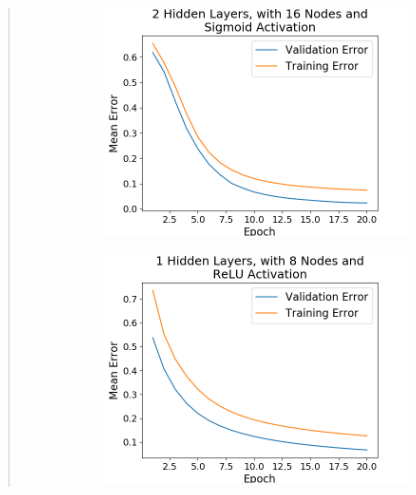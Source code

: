 \documentclass{article}
\begin{document}
\begin{quote}
\begin{figure}[h!]
\begin{subfigure}[h]{0.23\textwidth}
	\includegraphics[width=\textwidth]{figs/Cancer_Binary_Classification_2_Hidden_Layers_with_16_Nodes_and_Sigmoid_Activation.png}
\end{subfigure}
\end{figure}	
\begin{figure}[h]
\centering
\begin{subfigure}[h]{0.23\textwidth}
	\includegraphics[width=\textwidth]{figs/Cancer_Binary_Classification_1_Hidden_Layers_with_8_Nodes_and_ReLU_Activation.png}
\end{subfigure}
%
\begin{subfigure}[h]{0.23\textwidth}

\end{subfigure}
\end{figure}
\end{quote}
\end{document}
